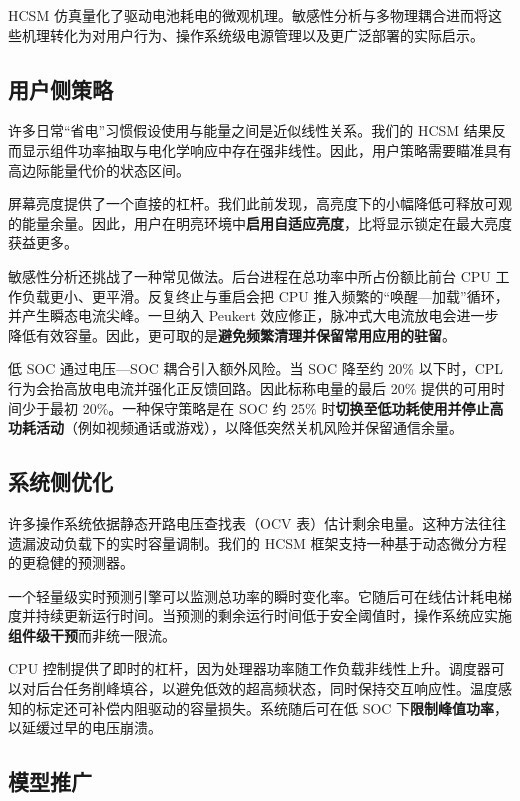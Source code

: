 \documentclass[11pt,a4paper]{ctexart}
\begin{document}
HCSM 仿真量化了驱动电池耗电的微观机理。敏感性分析与多物理耦合进而将这些机理转化为对用户行为、操作系统级电源管理以及更广泛部署的实际启示。

\subsection{用户侧策略}

许多日常“省电”习惯假设使用与能量之间是近似线性关系。我们的 HCSM 结果反而显示组件功率抽取与电化学响应中存在强非线性。因此，用户策略需要瞄准具有高边际能量代价的状态区间。

屏幕亮度提供了一个直接的杠杆。我们此前发现，高亮度下的小幅降低可释放可观的能量余量。因此，用户在明亮环境中\textbf{启用自适应亮度}，比将显示锁定在最大亮度获益更多。

敏感性分析还挑战了一种常见做法。后台进程在总功率中所占份额比前台 CPU 工作负载更小、更平滑。反复终止与重启会把 CPU 推入频繁的“唤醒—加载”循环，并产生瞬态电流尖峰。一旦纳入 Peukert 效应修正，脉冲式大电流放电会进一步降低有效容量。因此，更可取的是\textbf{避免频繁清理并保留常用应用的驻留}。

低 SOC 通过电压—SOC 耦合引入额外风险。当 SOC 降至约 20\% 以下时，CPL 行为会抬高放电电流并强化正反馈回路。因此标称电量的最后 20\% 提供的可用时间少于最初 20\%。一种保守策略是在 SOC 约 25\% 时\textbf{切换至低功耗使用并停止高功耗活动}（例如视频通话或游戏），以降低突然关机风险并保留通信余量。

\subsection{系统侧优化}

许多操作系统依据静态开路电压查找表（OCV 表）估计剩余电量。这种方法往往遗漏波动负载下的实时容量调制。我们的 HCSM 框架支持一种基于动态微分方程的更稳健的预测器。

一个轻量级实时预测引擎可以监测总功率的瞬时变化率。它随后可在线估计耗电梯度并持续更新运行时间。当预测的剩余运行时间低于安全阈值时，操作系统应实施\textbf{组件级干预}而非统一限流。

CPU 控制提供了即时的杠杆，因为处理器功率随工作负载非线性上升。调度器可以对后台任务削峰填谷，以避免低效的超高频状态，同时保持交互响应性。温度感知的标定还可补偿内阻驱动的容量损失。系统随后可在低 SOC 下\textbf{限制峰值功率}，以延缓过早的电压崩溃。

\subsection{模型推广}
\end{document}
